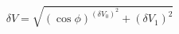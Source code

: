 \begin{equation}
\label{eq:delta_V_Malus}
\delta V = \sqrt{ \left(\cos{\phi}\right)^(\delta V_0)^2 + (\delta V_1)^2}
\end{equation}